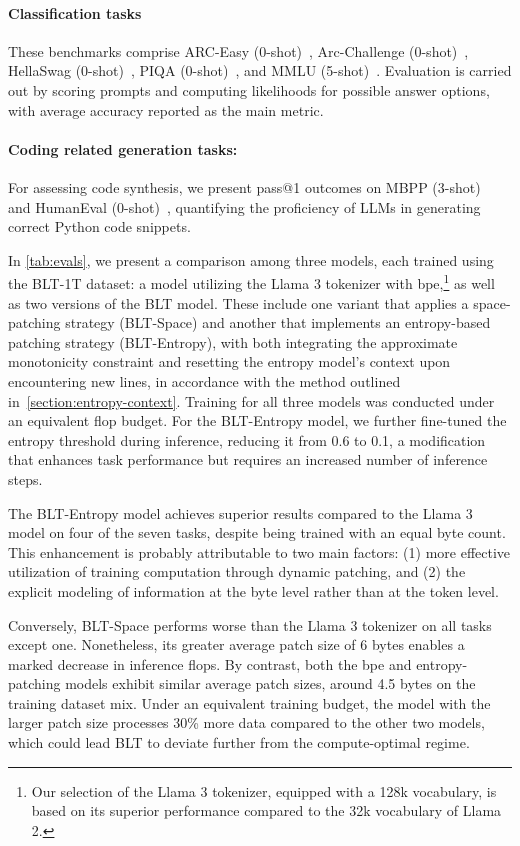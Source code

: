 \paragraph{Classification tasks} These benchmarks comprise ARC-Easy (0-shot)~\citep{Eval_ARC}, Arc-Challenge (0-shot)~\citep{Eval_ARC}, HellaSwag (0-shot)~\citep{Eval_hellaswag}, PIQA (0-shot)~\citep{Eval_piqa}, and MMLU (5-shot)~\citep{hendrycks2020measuring}. Evaluation is carried out by scoring prompts and computing likelihoods for possible answer options, with average accuracy reported as the main metric.
\paragraph{Coding related generation tasks:}  For assessing code synthesis, we present pass@1 outcomes on MBPP (3-shot)~\citep{Eval_MBPP} and HumanEval (0-shot)~\citep{Eval_HumanEval}, quantifying the proficiency of LLMs in generating correct Python code snippets.

In \autoref{tab:evals}, we present a comparison among three models, each trained using the {\textsc BLT}-1T dataset: a model utilizing the Llama 3 tokenizer with bpe,\footnote{Our selection of the Llama 3 tokenizer, equipped with a 128k vocabulary, is based on its superior performance compared to the 32k vocabulary of Llama 2.} as well as two versions of the {\textsc BLT} model. These include one variant that applies a space-patching strategy ({\textsc BLT}-Space) and another that implements an entropy-based patching strategy ({\textsc BLT}-Entropy), with both integrating the approximate monotonicity constraint and resetting the entropy model's context upon encountering new lines, in accordance with the method outlined in~\autoref{section:entropy-context}. Training for all three models was conducted under an equivalent flop budget. For the {\textsc BLT}-Entropy model, we further fine-tuned the entropy threshold during inference, reducing it from 0.6 to 0.1, a modification that enhances task performance but requires an increased number of inference steps.

The {\textsc BLT}-Entropy model achieves superior results compared to the Llama 3 model on four of the seven tasks, despite being trained with an equal byte count. This enhancement is probably attributable to two main factors: (1) more effective utilization of training computation through dynamic patching, and (2) the explicit modeling of information at the byte level rather than at the token level.

Conversely, {\textsc BLT}-Space performs worse than the Llama 3 tokenizer on all tasks except one. Nonetheless, its greater average patch size of 6 bytes enables a marked decrease in inference flops. By contrast, both the bpe and entropy-patching models exhibit similar average patch sizes, around 4.5 bytes on the training dataset mix. Under an equivalent training budget, the model with the larger patch size processes 30\% more data compared to the other two models, which could lead {\textsc BLT} to deviate further from the compute-optimal regime.


